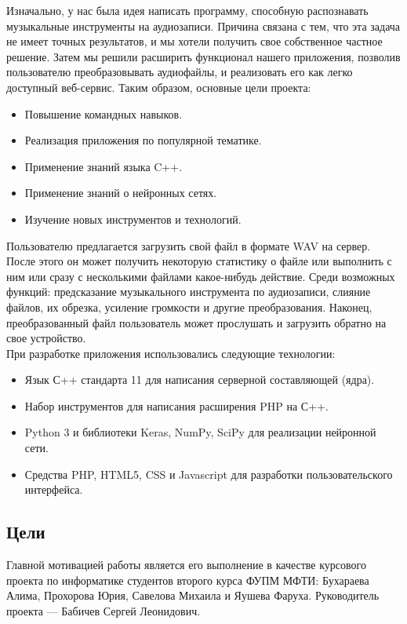\documentclass[14pt,a4paper]{article}
\begin{document}
Изначально, у нас была идея написать программу, способную распознавать музыкальные инструменты на аудиозаписи. Причина связана с тем, что эта задача не имеет точных результатов, и мы хотели получить свое собственное частное решение. Затем мы решили расширить функционал нашего приложения, позволив пользователю преобразовывать аудиофайлы, и реализовать его как легко доступный веб-сервис. Таким образом, основные цели проекта:
\begin{itemize}
\item Повышение командных навыков.
\item Реализация приложения по популярной тематике.
\item Применение знаний языка C++.
\item Применение знаний о нейронных сетях.
\item Изучение новых инструментов и технологий.
\end{itemize}

Пользователю предлагается загрузить свой файл в формате WAV на сервер. После этого он может получить некоторую статистику о файле или выполнить с ним или сразу с несколькими файлами какое-нибудь действие. Среди возможных функций: предсказание музыкального инструмента по аудиозаписи, слияние файлов, их обрезка, усиление громкости и другие преобразования. Наконец, преобразованный файл пользователь может прослушать и загрузить обратно на свое устройство.\\

При разработке приложения использовались следующие технологии:
\begin{itemize}
\item Язык С++ стандарта 11 для написания серверной составляющей (ядра).
\item Набор инструментов для написания расширения PHP на С++.
\item Python 3 и библиотеки Keras, NumPy, SciPy для реализации нейронной сети.
\item Средства PHP, HTML5, CSS и Javascript для разработки пользовательского интерфейса.
\end{itemize}

\subsection{Цели}

Главной мотивацией работы является его выполнение в качестве курсового проекта по информатике студентов второго курса ФУПМ МФТИ: Бухараева Алима, Прохорова Юрия, Савелова Михаила и Яушева Фаруха. Руководитель проекта --- Бабичев Сергей Леонидович. \\
\end{document}
